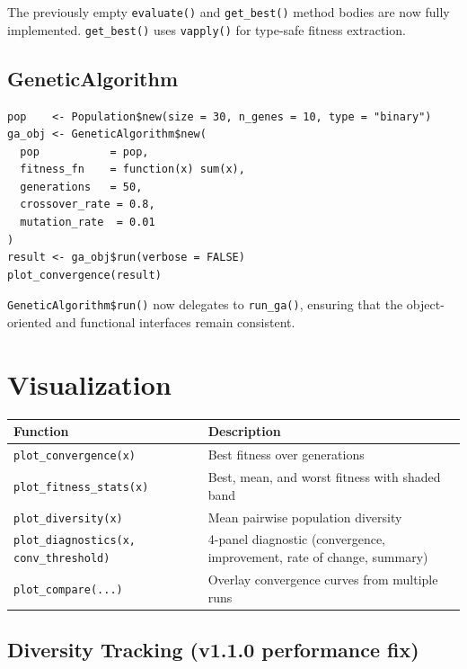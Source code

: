 \documentclass[11pt,a4paper]{article}
\begin{document}
The previously empty \texttt{evaluate()} and \texttt{get\_best()} method
bodies are now fully implemented. \texttt{get\_best()} uses
\texttt{vapply()} for type-safe fitness extraction.

\subsection{GeneticAlgorithm}

\begin{lstlisting}
pop    <- Population$new(size = 30, n_genes = 10, type = "binary")
ga_obj <- GeneticAlgorithm$new(
  pop           = pop,
  fitness_fn    = function(x) sum(x),
  generations   = 50,
  crossover_rate = 0.8,
  mutation_rate  = 0.01
)
result <- ga_obj$run(verbose = FALSE)
plot_convergence(result)
\end{lstlisting}

\texttt{GeneticAlgorithm\$run()} now delegates to \texttt{run\_ga()},
ensuring that the object-oriented and functional interfaces remain consistent.

\section{Visualization}

\begin{center}
\begin{tabular}{lp{9cm}}
  \toprule
  \textbf{Function} & \textbf{Description} \\
  \midrule
  \texttt{plot\_convergence(x)} & Best fitness over generations \\
  \texttt{plot\_fitness\_stats(x)} & Best, mean, and worst fitness with shaded band \\
  \texttt{plot\_diversity(x)} & Mean pairwise population diversity \\
  \texttt{plot\_diagnostics(x, conv\_threshold)} & 4-panel diagnostic (convergence, improvement, rate of change, summary) \\
  \texttt{plot\_compare(...)} & Overlay convergence curves from multiple runs \\
  \bottomrule
\end{tabular}
\end{center}

\subsection{Diversity Tracking (v1.1.0 performance fix)}
\end{document}
